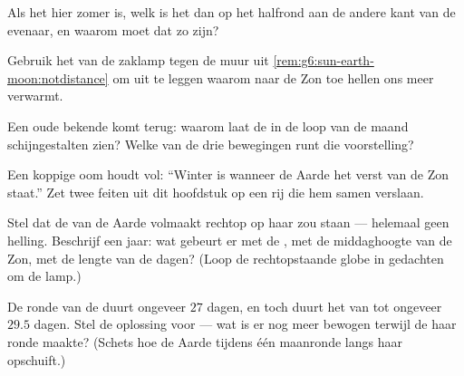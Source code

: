 \begin{exercise}[$\star$]\label{exo:g6:sun-earth-moon:6}
Als het hier zomer is, welk  is het dan op het halfrond aan de
andere kant van de evenaar, en waarom moet dat zo zijn?
\end{exercise}

\begin{exercise}[$\star$]\label{exo:g6:sun-earth-moon:7}
Gebruik het  van de zaklamp tegen de muur uit
\cref{rem:g6:sun-earth-moon:notdistance} om uit te leggen waarom naar
de Zon toe hellen ons meer verwarmt.
\end{exercise}

\begin{exercise}[$\star$]\label{exo:g6:sun-earth-moon:8}
Een oude bekende komt terug: waarom laat de  in de loop van de
maand schijngestalten zien? Welke van de drie bewegingen runt die
voorstelling?
\end{exercise}

\begin{exercise}[$\star\star$]\label{exo:g6:sun-earth-moon:9}
Een koppige oom houdt vol: ``Winter is wanneer de Aarde het verst van
de Zon staat.'' Zet twee feiten uit dit hoofdstuk op een rij die hem
samen verslaan.
\end{exercise}

\begin{exercise}[$\star\star$]\label{exo:g6:sun-earth-moon:10}
Stel dat de  van de Aarde volmaakt rechtop op haar
 zou staan --- helemaal geen helling. Beschrijf een jaar:
wat gebeurt er met de , met de middaghoogte van de Zon, met
de lengte van de dagen? (Loop de rechtopstaande globe in gedachten om
de lamp.)
\end{exercise}

\begin{exercise}[$\star\star$]\label{exo:g6:sun-earth-moon:11}
De ronde van de  duurt ongeveer $27$ dagen, en toch duurt het van
 tot  ongeveer $29.5$ dagen. Stel de
oplossing voor --- wat is er nog meer bewogen terwijl de  haar
ronde maakte? (Schets hoe de Aarde tijdens één maanronde langs haar
 opschuift.)
\end{exercise}

